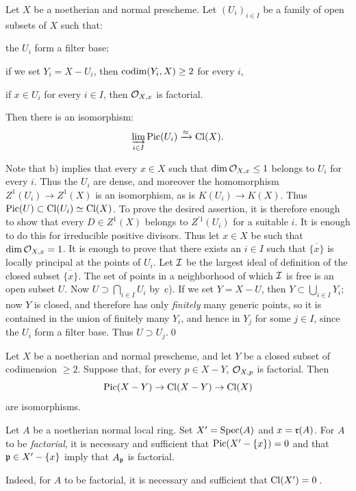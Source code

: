 \begin{propositionblah} \label{XI.3.7.1}
Let $X$ be a noetherian and normal prescheme. Let $(U_i)_{i\in I}$ be a family of open subsets of $X$ such that:
\begin{enumeratea}
\item
the $U_i$ form a filter base;
\item
if we set $Y_i=X-U_i$, then $\operatorname{codim}(Y_i, X)\geq 2$ for every $i$,
\item
if $x\in U_i$ for every $i\in I$, then $\mathcal O_{X,x}$ is factorial.
\end{enumeratea}
\noindent
Then there is an isomorphism:
\[
\varinjlim_{i\in I}\operatorname{Pic}(U_i)\xrightarrow{\approx}\operatorname{Cl}(X){}.
\]
\end{propositionblah} Note that b) implies that every $x\in X$ such that $\dim\mathcal O_{X,x}\leq 1$ belongs to $U_i$ for every $i$. Thus the $U_i$ are dense, and moreover the homomorphism $Z^1(U_i)\to Z^1(X)$ is an isomorphism, as is $K(U_i)\to K(X)$. Thus $\operatorname{Pic}(U)\subset \operatorname{Cl}(U_i) \simeq \operatorname{Cl}(X)$. To prove the desired assertion, it is therefore enough to show that every $D\in Z^1(X)$ belongs to $Z^{\prime1}(U_i)$ for a suitable $i$. It is enough to do this for irreducible positive \og divisors\fg. Thus let $x\in X$ be such that\pageoriginaled $\dim\mathcal O_{X,x}=1$. It is enough to prove that there exists an $i\in I$ such that $\overline{\{x\}}$ is locally principal at the points of $U_i$. Let $\mathcal I$ be the largest ideal of definition of the closed subset $\overline{\{x\}}$. The set of points in a neighborhood of which $\mathcal I$ is free is an open subset $U$. Now $U\supset \bigcap_{i\in I}U_i$ by~c). If we set $Y=X-U$, then $Y\subset \bigcup_{i\in I}Y_i$; now $Y$ is closed, and therefore has only \emph{finitely} many generic points, so it is contained in the union of finitely many $Y_i$, and hence in $Y_j$ for some $j\in I$, since the $U_i$ form a filter base. Thus $U\supset U_j$.\qed

\begin{corollaire} \label{XI.3.8}
Let $X$ be a noetherian and normal prescheme, and let $Y$ be a closed subset of codimension $\geq 2$. Suppose that, for every $p\in X-Y$, $\mathcal O_{X, p}$ is factorial. Then
\[
\operatorname{Pic}(X-Y)\to\operatorname{Cl}(X-Y)\to\operatorname{Cl}(X)
\]
are isomorphisms.
\end{corollaire}

\begin{corollaire} \label{XI.3.9}
Let $A$ be a noetherian normal local ring. Set $X'=\operatorname{Spec}(A)$ and $x = \mathfrak{r}(A)$. For $A$ to be \emph{factorial}, it is necessary and sufficient that $\operatorname{Pic}(X'-\{x\})=0$ and that $\mathfrak{p}\in X'-\{x\}$ imply that $A_{\mathfrak{p}}$ is factorial.
\end{corollaire}
Indeed, for $A$ to be factorial, it is necessary and sufficient that $\operatorname{Cl}(X')=0$\,.

